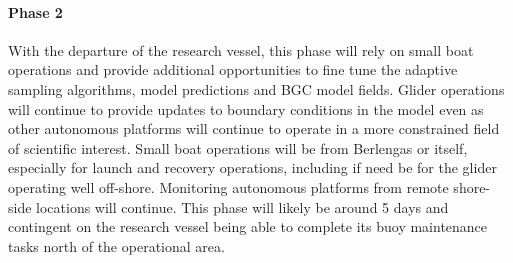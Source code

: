  

 

\paragraph{Phase 2} With the departure of the research vessel, this
phase will rely on small boat operations and provide additional
opportunities to fine tune the adaptive sampling algorithms, model
predictions and BGC model fields. Glider operations will continue to
provide updates to boundary conditions in the model even as other
autonomous platforms will continue to operate in a more constrained
field of scientific interest. Small boat operations will be from
Berlengas or \naz itself, especially for launch and recovery
operations, including if need be for the glider operating well
off-shore.  Monitoring autonomous platforms from remote shore-side
locations will continue. This phase will likely be around 5 days and
contingent on the research vessel being able to complete its buoy
maintenance tasks north of the operational area.

